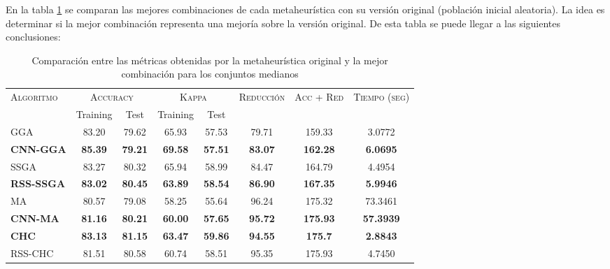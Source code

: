 En la tabla \ref{med-best-all} se comparan las mejores combinaciones de cada metaheurística con su versión original (población inicial aleatoria). La idea es determinar si la mejor combinación representa una mejoría sobre la versión original. De esta tabla se puede llegar a las siguientes conclusiones:

\begin{table}[h!]
\centering
\begin{adjustbox}{max width =\textwidth}
\begin{tabular}{l c c c c c c c}
\hline
\multirow{2}{*}{\textsc{Algoritmo}}
	& \multicolumn{2}{c}{\textsc{Accuracy}}
	& \multicolumn{2}{c}{\textsc{Kappa}}
	& \textsc{Reducción}
	& \textsc{Acc + Red}
	& \textsc{Tiempo (seg)} \\
	& Training & Test
	& Training & Test \\ 
\hline
\hline

GGA  & 83.20 & 79.62 & 65.93 & 57.53 & 79.71 & 159.33 & 3.0772 \\
\textbf{CNN-GGA}      & \textbf{85.39} & \textbf{79.21} & \textbf{69.58} & \textbf{57.51} & \textbf{83.07} & \textbf{162.28} & \textbf{6.0695} \\

\hline

SSGA & 83.27 & 80.32 & 65.94 & 58.99 & 84.47 & 164.79 & 4.4954 \\
\textbf{RSS-SSGA} & \textbf{83.02} & \textbf{80.45} & \textbf{63.89} & \textbf{58.54} & \textbf{86.90} & \textbf{167.35} & \textbf{5.9946} \\

\hline

MA   & 80.57 & 79.08 & 58.25 & 55.64 & 96.24 & 175.32 & 73.3461 \\
\textbf{CNN-MA} & \textbf{81.16} & \textbf{80.21} & \textbf{60.00} & \textbf{57.65} & \textbf{95.72} & \textbf{175.93} & \textbf{57.3939} \\

\hline

\textbf{CHC}  & \textbf{83.13} & \textbf{81.15} & \textbf{63.47} & \textbf{59.86} & \textbf{94.55} & \textbf{175.7}  & \textbf{2.8843} \\
RSS-CHC & 81.51 & 80.58 & 60.74 & 58.51 & 95.35 & 175.93 & 4.7450 \\

\hline
\end{tabular}
\end{adjustbox}
\caption{Comparación entre las métricas obtenidas por la metaheurística original y la mejor combinación para los conjuntos medianos}
\label{med-best-all}

\end{table}


